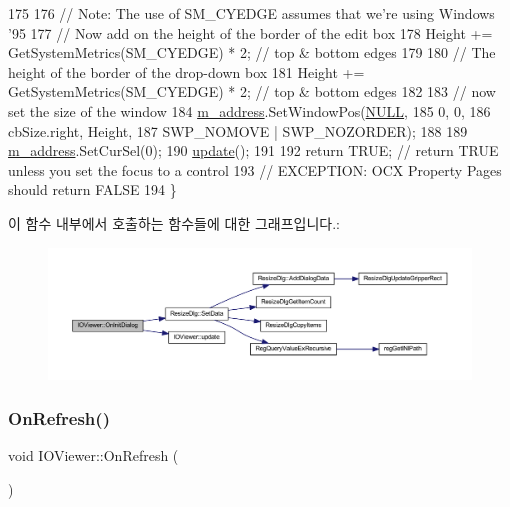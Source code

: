 \begin{DoxyCode}
175   
176   \textcolor{comment}{// Note: The use of SM\_CYEDGE assumes that we're using Windows '95}
177   \textcolor{comment}{// Now add on the height of the border of the edit box}
178   Height += GetSystemMetrics(SM\_CYEDGE) * 2;  \textcolor{comment}{// top & bottom edges}
179   
180   \textcolor{comment}{// The height of the border of the drop-down box}
181   Height += GetSystemMetrics(SM\_CYEDGE) * 2;  \textcolor{comment}{// top & bottom edges}
182   
183   \textcolor{comment}{// now set the size of the window}
184   \mbox{\hyperlink{class_i_o_viewer_ab381b72aee2da8c7f3c25ba58c69c3cd}{m\_address}}.SetWindowPos(\mbox{\hyperlink{getopt1_8c_a070d2ce7b6bb7e5c05602aa8c308d0c4}{NULL}},
185                          0, 0,
186                          cbSize.right, Height,
187                          SWP\_NOMOVE | SWP\_NOZORDER);
188 
189   \mbox{\hyperlink{class_i_o_viewer_ab381b72aee2da8c7f3c25ba58c69c3cd}{m\_address}}.SetCurSel(0);
190   \mbox{\hyperlink{class_i_o_viewer_a500c8fc593280ff95977fb59293b6ab6}{update}}();
191   
192   \textcolor{keywordflow}{return} TRUE;  \textcolor{comment}{// return TRUE unless you set the focus to a control}
193                 \textcolor{comment}{// EXCEPTION: OCX Property Pages should return FALSE}
194 \}
\end{DoxyCode}
이 함수 내부에서 호출하는 함수들에 대한 그래프입니다.\+:
\nopagebreak
\begin{figure}[H]
\begin{center}
\leavevmode
\includegraphics[width=350pt]{class_i_o_viewer_a4d36007016944a2ed21ee72323204f00_cgraph}
\end{center}
\end{figure}
\mbox{\label{class_i_o_viewer_a1a50f763e39ff7672a2665ab23e44ee7}} 
\subsubsection{\texorpdfstring{On\+Refresh()}{OnRefresh()}}
{\footnotesize\ttfamily void I\+O\+Viewer\+::\+On\+Refresh (\begin{DoxyParamCaption}{ }\end{DoxyParamCaption})\hspace{0.3cm}{\ttfamily [protected]}}



